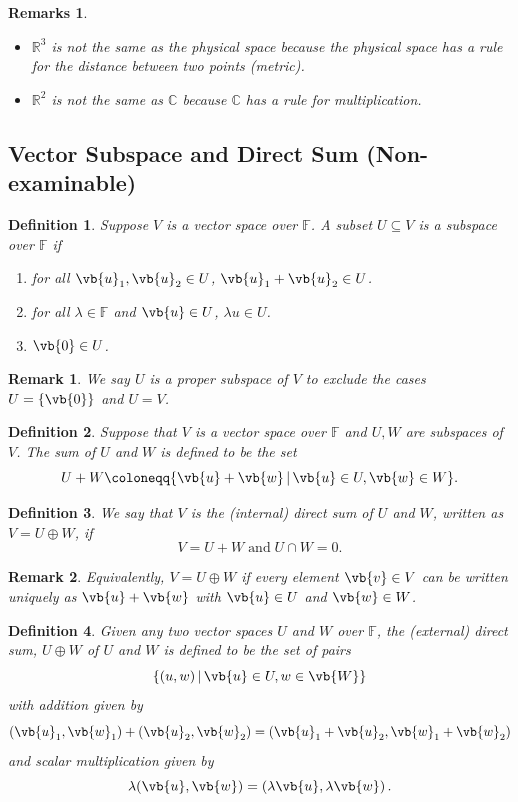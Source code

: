 \documentclass{article}
\theoremstyle{plain}\theoremheaderfont{\normalfont\itshape}\theorembodyfont{\rmfamily}\theoremseparator{.}\newtheorem*{rem}{Remark}\newtheorem*{ex}{Example}\newtheorem*{proof}{Proof}\newtheorem*{altp}{Alternative proof}
\theoremstyle{plain}\theoremheaderfont{\normalfont\bfseries}\theorembodyfont{\rmfamily}\theoremseparator{.}\newtheorem{thm}{Theorem}[section]\newtheorem{lem}[thm]{Lemma}\newtheorem{prop}[thm]{Proposition}\newtheorem*{cor}{Corollary}\newtheorem{defn}[thm]{Definition}\newtheorem{clm}[thm]{Claim}\newtheorem{clminproof}{Claim}
\theoremstyle{break}\theoremheaderfont{\normalfont\itshape}\theorembodyfont{\rmfamily}\theoremseparator{.\medskip}\newtheorem*{proofskip}{Proof}\newtheorem*{exs}{Examples}\newtheorem*{rems}{Remarks}
\theoremstyle{break}\theoremheaderfont{\normalfont\bfseries}\theorembodyfont{\rmfamily}\theoremseparator{.\medskip}\newtheorem{lemskip}[thm]{Lemma}\newtheorem{defnskip}[thm]{Definition}\newtheorem{propskip}[thm]{Proposition}\newtheorem{thmskip}[thm]{Theorem}
\numberwithin{equation}{section}
\begin{document}
	\begin{rems}
		\begin{itemize}[topsep=0pt]
			\item \(\mathbb{R}^3\) is not the same as the physical space because the physical space has a rule for the distance between two points (metric).
			\item \(\mathbb{R}^2\) is not the same as \(\mathbb{C}\) because \(\mathbb{C}\) has a rule for multiplication.
		\end{itemize}
	\end{rems}
	\subsection{Vector Subspace and Direct Sum (Non-examinable)}
	\begin{defn}
		Suppose \(V\) is a vector space over \(\mathbb{F}\). A subset \(U\subseteq V\) is a \textit{subspace} over \(\mathbb{F}\) if
		\begin{enumerate}[topsep=0pt]
			\item[(i)] for all \(\vb{u}_1,\vb{u}_2\in U\), \(\vb{u}_1+\vb{u}_2\in U\).
			\item[(ii)] for all \(\lambda\in\mathbb{F}\) and \(\vb{u}\in U\), \(\lambda u\in U\).
			\item[(iii)] \(\vb{0}\in U\).
		\end{enumerate}
	\end{defn}
	\begin{rem}
		We say \(U\) is a \textit{proper subspace} of \(V\) to exclude the cases \(U=\{\vb{0}\}\) and \(U=V\).
	\end{rem}
	\begin{defn}
		Suppose that \(V\) is a vector space over \(\mathbb{F}\) and \(U, W\) are subspaces of \(V\). The \textit{sum} of \(U\) and \(W\) is defined to be the set
		\[U+W\coloneqq\{\vb{u}+\vb{w} \,|\, \vb{u}\in U, \vb{w}\in W\}.\]
	\end{defn}
	\begin{defn}
		We say that \(V\) is the \textit{(internal) direct sum} of \(U\) and \(W\), written as \(V=U\oplus W\), if
		\[V=U+W\;\text{and}\; U \cap W=0.\]
	\end{defn}
	\begin{rem}
		Equivalently, \(V=U\oplus W\) if every element \(\vb{v}\in V\) can be written uniquely as \(\vb{u}+\vb{w}\) with \(\vb{u}\in U\) and \(\vb{w}\in W\).
	\end{rem}
	\begin{defn}
		Given any two vector spaces \(U\) and \(W\) over \(\mathbb{F}\), the \textit{(external) direct sum}, \(U \oplus W\) of \(U\) and \(W\) is defined to be the set of pairs
		\[\{(u, w) \,|\, \vb{u}\in U, w \in \vb{W}\}\]
		with addition given by
		\[(\vb{u}_1, \vb{w}_1) + (\vb{u}_2, \vb{w}_2) = (\vb{u}_1 + \vb{u}_2, \vb{w}_1 + \vb{w}_2)\]
		and scalar multiplication given by
		\[\lambda(\vb{u}, \vb{w}) = (\lambda\vb{u},\lambda\vb{w})\,.\]
	\end{defn}
\end{document}

